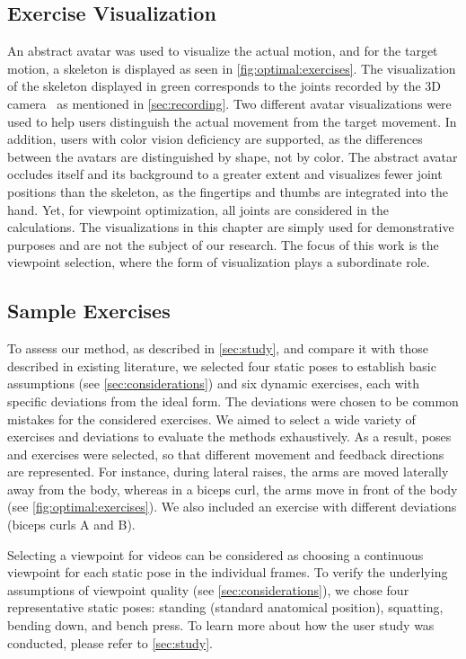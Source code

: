 \subsection{Exercise Visualization \label{sec:exercise}}
An abstract avatar was used to visualize the actual motion, and for the target motion, a skeleton is displayed as seen in \autoref{fig:optimal:exercises}. The visualization of the skeleton displayed in green corresponds to the joints recorded by the 3D camera~\cite{kinect:documentation} as mentioned in \autoref{sec:recording}. Two different avatar visualizations were used to help users distinguish the actual movement from the target movement. In addition, users with color vision deficiency are supported, as the differences between the avatars are distinguished by shape, not by color. The abstract avatar occludes itself and its background to a greater extent and visualizes fewer joint positions than the skeleton, as the fingertips and thumbs are integrated into the hand. Yet, for viewpoint optimization, all joints are considered in the calculations. The visualizations in this chapter are simply used for demonstrative purposes and are not the subject of our research. The focus of this work is the viewpoint selection, where the form of visualization plays a subordinate role.

\subsection{Sample Exercises \label{sec:sample}}
To assess our method, as described in \autoref{sec:study}, and compare it with those described in existing literature, we selected four static poses to establish basic assumptions (see \autoref{sec:considerations}) and six dynamic exercises, each with specific deviations from the ideal form. The deviations were chosen to be common mistakes for the considered exercises. We aimed to select a wide variety of exercises and deviations to evaluate the methods exhaustively. As a result, poses and exercises were selected, so that different movement and feedback directions are represented. For instance, during lateral raises, the arms are moved laterally away from the body, whereas in a biceps curl, the arms move in front of the body (see \autoref{fig:optimal:exercises}). We also included an exercise with different deviations (biceps curls A and B).

Selecting a viewpoint for videos can be considered as choosing a continuous viewpoint for each static pose in the individual frames. To verify the underlying assumptions of viewpoint quality (see \autoref{sec:considerations}), we chose four representative static poses: standing (standard anatomical position), squatting, bending down, and bench press. To learn more about how the user study was conducted, please refer to \autoref{sec:study}.

